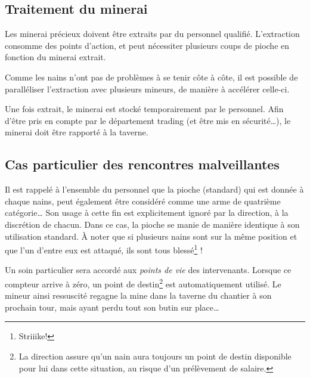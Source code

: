\subsection{Traitement du minerai}

  Les minerai précieux doivent être extraits par du personnel qualifié.
  L'extraction consomme des points d'action, et peut nécessiter plusieurs coups
  de pioche en fonction du minerai extrait.

  Comme les nains n'ont pas de problèmes à se tenir côte à côte, il est
  possible de paralléliser l'extraction avec plusieurs mineurs, de manière à
  accélérer celle-ci.

  Une fois extrait, le minerai est stocké temporairement par le personnel. Afin
  d'être pris en compte par le département trading (et être mis en
  sécurité\ldots{}), le minerai doit être rapporté à la taverne.

\subsection{Cas particulier des rencontres malveillantes}

  Il est rappelé à l'ensemble du personnel que la pioche (standard) qui est
  donnée à chaque nains, peut également être considéré comme une arme de
  quatrième catégorie\ldots{} Son usage à cette fin est explicitement ignoré par la
  direction, à la discrétion de chacun. Dans ce cas, la pioche se manie de
  manière identique à son utilisation standard. À noter que si plusieurs nains
  sont sur la même position et que l'un d'entre eux est attaqué, ils sont tous
  blessé\footnote{Striiike!} !

Un soin particulier sera accordé aux \textit{points de vie} des intervenants.
Lorsque ce compteur arrive à zéro, un point de destin\footnote{La direction
assure qu'un nain aura toujours un point de destin disponible pour lui dans
cette situation, au risque d'un prélèvement de salaire.} est automatiquement
utilisé. Le mineur ainsi ressuscité regagne la mine dans la taverne du chantier
à son prochain tour, mais ayant perdu tout son butin sur place\ldots{}

